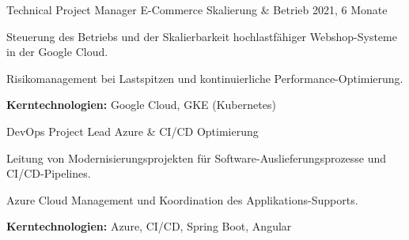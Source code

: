 \begin{cventries}
\vspace{2mm}
  \cventry
    {Technical Project Manager} %
    {E-Commerce Skalierung \& Betrieb} %
    {} %
    {2021, 6 Monate} %
    {
      \begin{cvitems} %
        \item {Steuerung des Betriebs und der Skalierbarkeit hochlastfähiger Webshop-Systeme in der Google Cloud.}
        \item {Risikomanagement bei Lastspitzen und kontinuierliche Performance-Optimierung.}
        \item {\textbf{Kerntechnologien:} Google Cloud, GKE (Kubernetes)}
      \end{cvitems}
    }

\vspace{2mm}
  \cventry
    {DevOps Project Lead} %
    {Azure \& CI/CD Optimierung} %
    {} %
    {} %
    {
      \begin{cvitems} %
        \item {Leitung von Modernisierungsprojekten für Software-Auslieferungsprozesse und CI/CD-Pipelines.}
        \item {Azure Cloud Management und Koordination des Applikations-Supports.}
        \item {\textbf{Kerntechnologien:} Azure, CI/CD, Spring Boot, Angular}
      \end{cvitems}
    }

\vspace{2mm}
\end{cventries}
